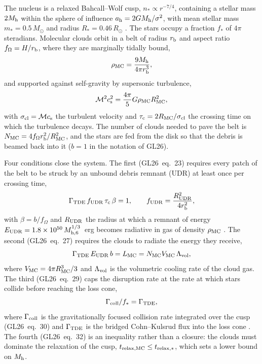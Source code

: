 \documentclass[twocolumn,pdftex]{aastex701}
\newcommand{\msun}{M_{\odot}}
\newcommand{\Mh}{M_{\rm h}}
\newcommand{\mhsix}{M_{\rm h,6}}
\newcommand{\fst}{f_{\ast}}
\newcommand{\fOm}{f_{\Omega}}
\newcommand{\GL}{GL26}
\begin{document}
The nucleus is a relaxed Bahcall--Wolf cusp, $n_\ast\propto r^{-7/4}$, containing a stellar mass $2\Mh$ within the sphere of influence $a_{\rm h} = 2G\Mh/\sigma^2$, with mean stellar mass $m_\ast = 0.5\,\msun$ and radius $R_\ast = 0.46\,R_\odot$ \citep{Tout:1996a}. The stars occupy a fraction $\fst$ of $4\pi$ steradians. Molecular clouds orbit in a belt of radius $r_{\rm b}$ and aspect ratio $\fOm = H/r_{\rm b}$, where they are marginally tidally bound,
\begin{equation}
\rho_{\rm MC} = \frac{9\Mh}{4\pi r_{\rm b}^{3}},
\label{eq:tidal}
\end{equation}
and supported against self-gravity by supersonic turbulence,
\begin{equation}
\mathcal{M}^{2}c_{\rm s}^{2} = \frac{4\pi}{5}G\rho_{\rm MC}R_{\rm MC}^{2},
\label{eq:virial}
\end{equation}
with $\sigma_{\rm cl} = \mathcal{M}c_{\rm s}$ the turbulent velocity and $\tau_{\rm c} = 2R_{\rm MC}/\sigma_{\rm cl}$ the crossing time on which the turbulence decays. The number of clouds needed to pave the belt is $N_{\rm MC} = 4\fOm r_{\rm b}^{2}/R_{\rm MC}^{2}$, and the stars are fed from the disk so that the debris is beamed back into it ($b=1$ in the notation of \GL).

Four conditions close the system. The first (\GL\ eq.~23) requires every patch of the belt to be struck by an unbound debris remnant (UDR) at least once per crossing time,
\begin{equation}
\Gamma_{\rm TDE}\,f_{\rm UDR}\,\tau_{\rm c}\,\beta = 1,\qquad f_{\rm UDR} = \frac{R_{\rm UDR}^{2}}{4r_{\rm b}^{2}},
\label{eq:C1}
\end{equation}
with $\beta = b/\fOm$ and $R_{\rm UDR}$ the radius at which a remnant of energy $E_{\rm UDR} = 1.8\times10^{50}\,\mhsix^{1/3}$~erg \citep{Guillochon:2016b} becomes radiative in gas of density $\rho_{\rm MC}$ \citep{Sedov:1946a,Taylor:1950a,Blondin:1998a}. The second (\GL\ eq.~27) requires the clouds to radiate the energy they receive,
\begin{equation}
\Gamma_{\rm TDE}\,E_{\rm UDR}\,b = L_{\rm MC} = N_{\rm MC}V_{\rm MC}\,\Lambda_{\rm vol},
\label{eq:C2}
\end{equation}
where $V_{\rm MC} = 4\pi R_{\rm MC}^{3}/3$ and $\Lambda_{\rm vol}$ is the volumetric cooling rate of the cloud gas. The third (\GL\ eq.~29) caps the disruption rate at the rate at which stars collide before reaching the loss cone,
\begin{equation}
\Gamma_{\rm coll}/\fst = \Gamma_{\rm TDE},
\label{eq:C3}
\end{equation}
where $\Gamma_{\rm coll}$ is the gravitationally focused collision rate integrated over the cusp (\GL\ eq.~30) and $\Gamma_{\rm TDE}$ is the bridged Cohn--Kulsrud flux into the loss cone \citep{Cohn:1978a,Merritt:2013a,Vasiliev:2013a,Stone:2016a}. The fourth (\GL\ eq.~32) is an inequality rather than a closure: the clouds must dominate the relaxation of the cusp, $t_{\rm relax,MC} \le t_{\rm relax,\ast}$, which sets a lower bound on $\Mh$.
\end{document}
